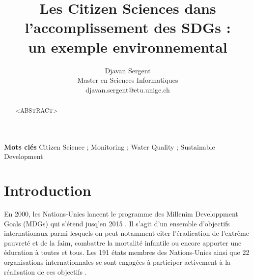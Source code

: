\documentclass[10pt, conference, compsocconf]{llncs}
\begin{document}
%
\title{Les Citizen Sciences dans\\l'accomplissement des SDGs : \\un exemple environnemental}





% 
\author{Djavan Sergent \\
Master en Sciences Informatiques \\
djavan.sergent@etu.unige.ch}




\maketitle


\begin{abstract}
	<ABSTRACT>
\end{abstract}


\textbf{Mots clés} Citizen Science ; Monitoring ; Water Quality ; Sustainable Development


\section{Introduction}
	En 2000, les Nations-Unies lancent le programme des Millenim Developpment Goals (MDGs) qui s'étend jusq'en 2015 \cite{united_nations_millennium_2009}. Il s'agit d'un ensemble d'objectifs internationaux parmi lesquels on peut notamment citer l'éradication de l'extrême pauvreté et de la faim, combattre la mortalité infantile ou encore apporter une éducation à toutes et tous. Les 191 états membres des Nations-Unies ainsi que 22 organisations internationnales se sont engagées à participer activement à la réalisation de ces objectifs \cite{wikipedia_millennium_2017}.
	
\end{document}
